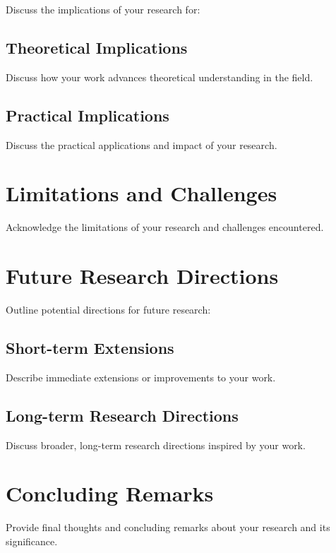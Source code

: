 Discuss the implications of your research for:

\subsection{Theoretical Implications}
\label{subsec:theoretical-implications}

Discuss how your work advances theoretical understanding in the field.

\subsection{Practical Implications}
\label{subsec:practical-implications}

Discuss the practical applications and impact of your research.

\section{Limitations and Challenges}
\label{sec:limitations-challenges}

Acknowledge the limitations of your research and challenges encountered.

\section{Future Research Directions}
\label{sec:future-work}

Outline potential directions for future research:

\subsection{Short-term Extensions}
\label{subsec:short-term}

Describe immediate extensions or improvements to your work.

\subsection{Long-term Research Directions}
\label{subsec:long-term}

Discuss broader, long-term research directions inspired by your work.

\section{Concluding Remarks}
\label{sec:concluding-remarks}

Provide final thoughts and concluding remarks about your research and its significance.
